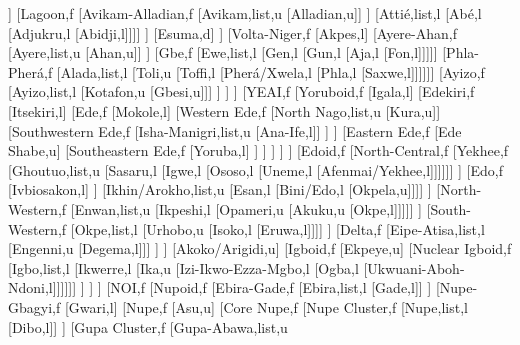\documentclass[landscape]{standalone}
\begin{document}
\begin{forest}
						[Agotime,l]
					]
					[Lagoon,f
						[Avikam-Alladian,f
							[Avikam,list,u
							[Alladian,u]]
						]
						[Attié,list,l
						[Abé,l
						[Adjukru,l
						[Abidji,l]]]]
					]
					[Esuma,d]
				]%
				[Volta-Niger,f
					[Akpes,l]
					[Ayere-Ahan,f
						[Ayere,list,u
						[Ahan,u]]
					]
					[Gbe,f
						[Ewe,list,l
						[Gen,l
						[Gun,l
						[Aja,l
						[Fon,l]]]]]
						[Phla-Pherá,f
							[Alada,list,l
							[Toli,u
							[Toffi,l
							[Pherá/Xwela,l
							[Phla,l
							[Saxwe,l]]]]]]
							[Ayizo,f
								[Ayizo,list,l
								[Kotafon,u
								[Gbesi,u]]]
							]
						]
					]%
					[YEAI,f
						[Yoruboid,f
							[Igala,l]
							[Edekiri,f
								[Itsekiri,l]
								[Ede,f
									[Mokole,l]
									[Western Ede,f
										[North Nago,list,u
										[Kura,u]]
										[Southwestern Ede,f
											[Isha-Manigri,list,u
											[Ana-Ife,l]]
										]%
									]%
									[Eastern Ede,f
										[Ede Shabe,u]
										[Southeastern Ede,f
											[Yoruba,l]
										]
									]%
								]%
							]%
						]%
						[Edoid,f
							[North-Central,f
								[Yekhee,f
									[Ghoutuo,list,u
									[Sasaru,l
									[Igwe,l
									[Ososo,l
									[Uneme,l
									[Afenmai/Yekhee,l]]]]]]
								]%
								[Edo,f
									[Ivbiosakon,l]
								]%
								[Ikhin/Arokho,list,u
								[Esan,l
								[Bini/Edo,l
								[Okpela,u]]]]
							]%
							[North-Western,f
								[Enwan,list,u
								[Ikpeshi,l
								[Opameri,u
								[Akuku,u
								[Okpe,l]]]]]
							]%
							[South-Western,f
								[Okpe,list,l
								[Urhobo,u
								[Isoko,l
								[Eruwa,l]]]]
							]%
							[Delta,f
								[Eipe-Atisa,list,l
								[Engenni,u
								[Degema,l]]]
							]%
						]%
						[Akoko/Arigidi,u]
						[Igboid,f
							[Ekpeye,u]
							[Nuclear Igboid,f
								[Igbo,list,l
								[Ikwerre,l
								[Ika,u
								[Izi-Ikwo-Ezza-Mgbo,l
								[Ogba,l
								[Ukwuani-Aboh-Ndoni,l]]]]]]
							]%
						]%
					]%
					[NOI,f
						[Nupoid,f
							[Ebira-Gade,f
								[Ebira,list,l
								[Gade,l]]
							]%
							[Nupe-Gbagyi,f
								[Gwari,l]
								[Nupe,f
									[Asu,u]
									[Core Nupe,f
										[Nupe Cluster,f
											[Nupe,list,l
											[Dibo,l]]
										]%
										[Gupa Cluster,f
											[Gupa-Abawa,list,u

\end{forest}
\end{document}
